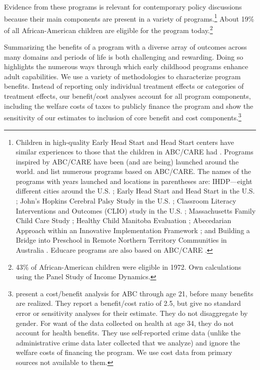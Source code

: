 Evidence from these programs is relevant for contemporary policy discussions because their main components are present in a variety of programs.\footnote{Children in high-quality Early Head Start and Head Start centers have similar experiences to those that the children in ABC/CARE had \citep{HeadStart_2010_ChoosingPreschoolCurriculum,Puma_Bell_etal_2010_HeadStartImpact,Elango_Hojman_etal_2016_Early-Edu}. Programs inspired by ABC/CARE have been (and are being) launched around the world. \citet{Sparling_2010_Highlights} and \citet{Ramey_Ramey_Lanzi_2014_Interventions} list numerous programs based on ABC/CARE. The names of the programs with years launched and locations in parentheses are: IHDP---eight different cities around the U.S. \citep{Spiker-etal_1997_Helping}; Early Head Start and Head Start in the U.S. \citep{Schneider_McDonald-eds_2007_Scale-Up_Vol-1}; John's Hopkins Cerebral Palsy Study in the U.S. \citep{Sparling_2010_Highlights}; Classroom Literacy Interventions and Outcomes (CLIO) study in the U.S. \citep{Sparling_2010_Highlights}; Massachusetts Family Child Care Study \citep{Collins_etal_2010_Massachusetts-Study}; Healthy Child Manitoba Evaluation \citep{Healthy_Child_Manitoba_2015_Starting-Early}; Abecedarian Approach within an Innovative Implementation Framework \citep{Jensen_Nielsen_2016_ABC-Programme-Pilot}; and Building a Bridge into Preschool in Remote Northern Territory Communities in Australia \citep{UMonash_Dataset_2015_URL}. Educare programs are also based on ABC/CARE \citep{Educare_2014_Research_Agenda,Yazejian_Bryant_2012_Educare}.} About 19\% of all African-American children are eligible for the program today.\footnote{43\% of African-American children were eligible in 1972. Own calculations using the Panel Study of Income Dynamics.}

Summarizing the benefits of a program with a diverse array of outcomes across many domains and periods of life is both challenging and rewarding. Doing so highlights the numerous ways through which early childhood programs enhance adult capabilities. We use a variety of methodologies to characterize program benefits. Instead of reporting only individual treatment effects or categories of treatment effects, our benefit/cost analyses account for all program components, including the welfare costs of taxes to publicly finance the program and show the sensitivity of our estimates to inclusion of core benefit and cost components.\footnote{\cite{Barnett_Masse_2002_benefitcost,Barnett_Masse_2007_EER} present a cost/benefit analysis for ABC through age 21, before many benefits are realized. They report a benefit/cost ratio of 2.5, but give no standard error or sensitivity analyses for their estimate. They do not disaggregate by gender. For want of the data collected on health at age 34, they do not account for health benefits. They use self-reported crime data (unlike the administrative crime data later collected that we analyze) and ignore the welfare costs of financing the program. We use cost data from primary sources not available to them.}

